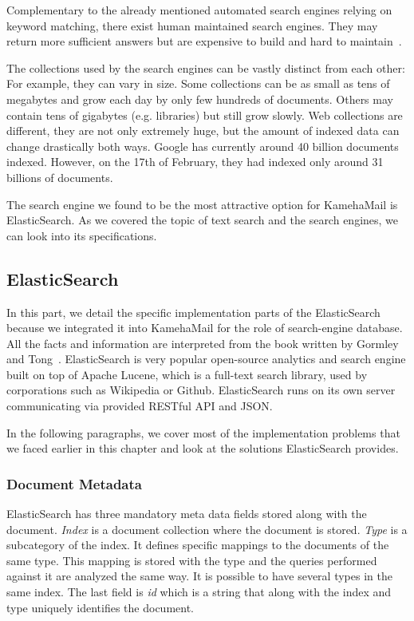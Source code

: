 Complementary to the already mentioned automated search engines relying on keyword matching, there exist human maintained search engines. They may return more sufficient answers but are expensive to build and hard to maintain~\cite{google}.

The collections used by the search engines can be vastly distinct from each other: For example, they can vary in size. Some collections can be as small as tens of megabytes and grow each day by only few hundreds of documents. Others may contain tens of gigabytes (e.g. libraries) but still grow slowly. Web collections are different, they are not only extremely huge, but the amount of indexed data can change drastically both ways. Google has currently around 40 billion documents indexed. However, on the 17th of February, they had indexed only around 31 billions of documents.

The search engine we found to be the most attractive option for KamehaMail is ElasticSearch. As we covered the topic of text search and the search engines, we can look into its specifications.

\subsection{ElasticSearch}
\label{es}
In this part, we detail the specific implementation parts of the ElasticSearch because we integrated it into KamehaMail for the role of search-engine database. All the facts and information are interpreted from the book written by Gormley and Tong~\cite{elastic}.
ElasticSearch is very popular open-source analytics and search engine built on top of Apache Lucene, which is a full-text search library, used by corporations such as Wikipedia or Github. ElasticSearch runs on its own server communicating via provided RESTful API and JSON.

In the following paragraphs, we cover most of the implementation problems that we faced earlier in this chapter and look at the solutions ElasticSearch provides.

\subsubsection{Document Metadata}
ElasticSearch has three mandatory meta data fields stored along with the document. \emph{Index} is a document collection where the document is stored. \emph{Type} is a subcategory of the index. It defines specific mappings to the documents of the same type. This mapping is stored with the type and the queries performed against it are analyzed the same way. It is possible to have several types in the same index.
The last field is \emph{id} which is a string that along with the index and type uniquely identifies the document.

